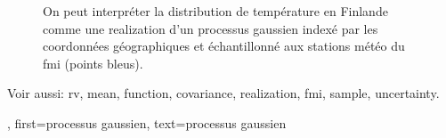 {{\begin{figure}[H]
\begin{center}
				\vspace*{-15mm}
			\end{center}
			\caption{On peut interpréter la distribution de température en Finlande comme une \gls{realization} 
				d’un processus gaussien indexé par les coordonnées géographiques et échantillonné aux stations météo du \gls{fmi} (points bleus). \label{fig_gp_FMI_dict}}
		\end{figure}
		Voir aussi: \gls{rv}, \gls{mean}, \gls{function}, \gls{covariance}, \gls{realization}, \gls{fmi}, \gls{sample}, \gls{uncertainty}.}, 
	first={processus gaussien}, 
	text={processus gaussien}
}

